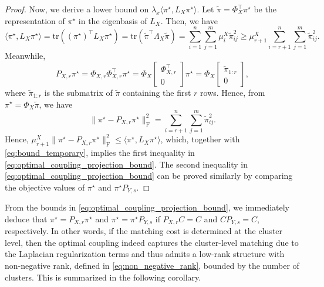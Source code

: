 \documentclass{article}
\theoremstyle{definition}
\begin{document}
\begin{proof}
    Now, we derive a lower bound on $\lambda_x \langle \pi^\star, L_X \pi^\star \rangle$. Let $\tilde{\pi} = \Phi_X^\top \pi^\star$ be the representation of $\pi^\star$ in the eigenbasis of $L_X$. Then, we have
    \begin{equation*}
        \langle \pi^\star, L_X \pi^\star \rangle = \mathrm{tr}((\pi^\star)^\top L_X \pi^\star) = \mathrm{tr}(\tilde{\pi}^\top \Lambda_X \tilde{\pi}) = \sum_{i = 1}^{n} \sum_{j = 1}^{m} \mu_i^X \tilde{\pi}_{i j}^2 \ge \mu_{r + 1}^X \sum_{i = r + 1}^{n} \sum_{j = 1}^{m} \tilde{\pi}_{i j}^2.
    \end{equation*}
    Meanwhile,
    \begin{equation*}
        P_{X, r} \pi^\star
        = \Phi_{X, r} \Phi_{X, r}^\top \pi^\star
        = \Phi_X \begin{bmatrix}
            \Phi_{X, r}^\top \\ 0
        \end{bmatrix} \pi^\star
        = \Phi_X \begin{bmatrix}
            \tilde{\pi}_{1:r} \\
            0
        \end{bmatrix},
    \end{equation*}
    where $\tilde{\pi}_{1:r}$ is the submatrix of $\tilde{\pi}$ containing the first $r$ rows. Hence, from $\pi^\star = \Phi_X \tilde{\pi}$, we have
    \begin{equation*}
        \|\pi^\star - P_{X, r} \pi^\star\|_{\mathrm{F}}^2 = \sum_{i = r + 1}^{n} \sum_{j = 1}^{m} \tilde{\pi}_{i j}^2.
    \end{equation*}
    Hence, $\mu_{r + 1}^X \|\pi^\star - P_{X, r} \pi^\star\|_{\mathrm{F}}^2 \le \langle \pi^\star, L_X \pi^\star \rangle$, which, together with \eqref{eq:bound_temporary}, implies the first inequality in \eqref{eq:optimal_coupling_projection_bound}. The second inequality in \eqref{eq:optimal_coupling_projection_bound} can be proved similarly by comparing the objective values of $\pi^\star$ and $\pi^\star P_{Y, s}$.
\end{proof}

From the bounds in \eqref{eq:optimal_coupling_projection_bound}, we immediately deduce that $\pi^\star = P_{X, r} \pi^\star$ and $\pi^\star = \pi^\star P_{Y, s}$ if $P_{X, r} C = C$ and $C P_{Y, s} = C$, respectively. In other words, if the matching cost is determined at the cluster level, then the optimal coupling indeed captures the cluster-level matching due to the Laplacian regularization terms and thus admits a low-rank structure with non-negative rank, defined in \eqref{eq:non_negative_rank}, bounded by the number of clusters. This is summarized in the following corollary.
\end{document}
